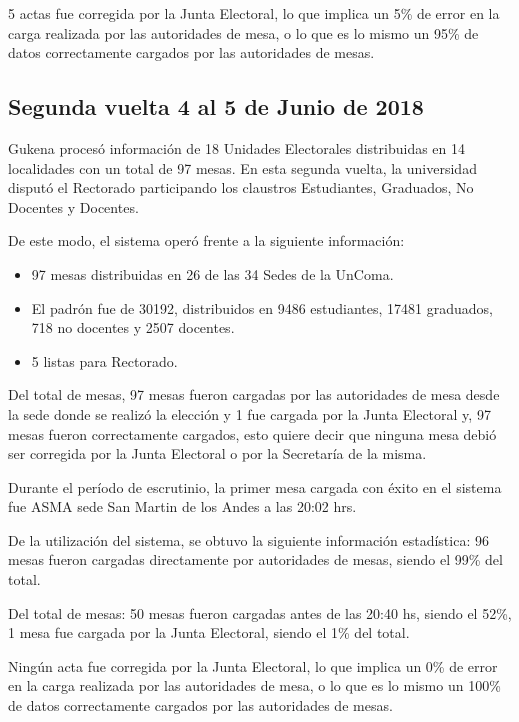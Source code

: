 5 actas fue corregida por la Junta Electoral, lo que implica un 5\% de error en la carga realizada por las autoridades de mesa, o lo que es lo mismo un 95\% de datos correctamente cargados por las autoridades de mesas.

\subsection{Segunda vuelta 4 al 5 de Junio de 2018}
Gukena procesó información de 18 Unidades Electorales distribuidas en 14 localidades con un total de 97 mesas. En esta segunda vuelta, la universidad disputó el Rectorado participando los claustros Estudiantes, Graduados, No Docentes y Docentes.

De este modo, el sistema operó frente a la siguiente información:
\begin{itemize}
    \item 97 mesas distribuidas en 26 de las 34 Sedes de la UnComa.
     \item El padrón fue de  30192, distribuidos en 9486 estudiantes, 17481 graduados, 718 no docentes y 2507 docentes.
     \item 5 listas para Rectorado.
\end{itemize}
Del total de mesas, 97 mesas fueron cargadas por las autoridades de mesa desde la sede donde se realizó la elección y 1 fue cargada por la Junta Electoral y, 97 mesas fueron correctamente cargados, esto quiere decir que ninguna mesa debió ser corregida por la Junta Electoral o por la Secretaría de la misma.

Durante el período de escrutinio, la primer mesa cargada con éxito en el sistema fue ASMA sede San Martin de los Andes a las 20:02 hrs.

De la utilización del sistema, se obtuvo la siguiente información estadística:
96 mesas fueron cargadas directamente por autoridades de mesas, siendo el 99\% del total.

Del total de mesas:
50 mesas fueron cargadas antes de las 20:40 hs, siendo el 52\%,
1 mesa fue cargada 	por la Junta Electoral, siendo el 1\% del total.

Ningún acta fue corregida por la Junta Electoral, lo que implica un 0\% de error en la carga realizada por las autoridades de mesa, o lo que es lo mismo un 100\% de datos correctamente cargados por las autoridades de mesas.

